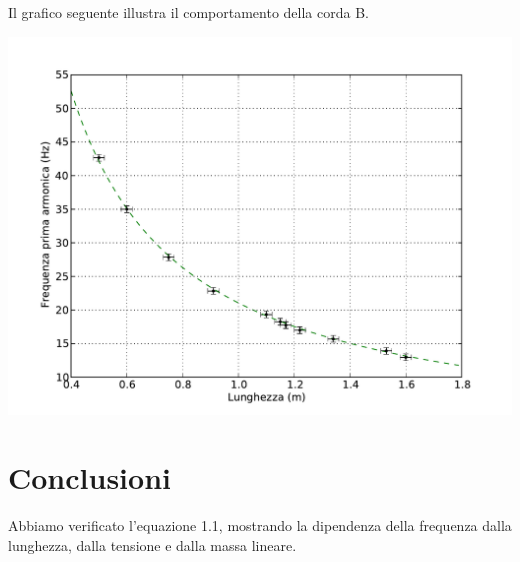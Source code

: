 Il grafico seguente illustra il comportamento della corda B.

\includegraphics[scale=0.75]{"../grafici/CordaPrimaArmonica"}


\section{Conclusioni}
Abbiamo verificato l'equazione 1.1, mostrando la dipendenza della frequenza dalla lunghezza, dalla tensione e dalla massa lineare. 
